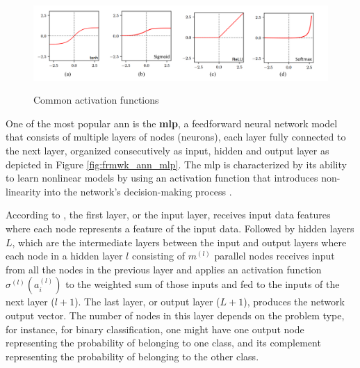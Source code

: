 \begin{figure}[htbp]
    \raggedright
        \caption{Common activation functions}
        \includegraphics[width=1\textwidth]{resources/images/030-theoretical_framework/Framework_ann_activation_function.png}
        \label{fig:frmwk_ann_activation_functions}
\end{figure}

One of the most popular \gls{ann} is the \textbf{\gls{mlp}}, a feedforward neural network model that consists of multiple layers of nodes (neurons), each layer fully connected to the next layer, organized consecutively as input, hidden and output layer as depicted in Figure \ref{fig:frmwk_ann_mlp}. The \gls{mlp} is characterized by its ability to learn nonlinear models by using an activation function that introduces non-linearity into the network's decision-making process \cite{Mitchell1997}.

According to \textcite{Russel2010}, the first layer, or the input layer, receives input data features where each node represents a feature of the input data. Followed by hidden layers $L$, which are the intermediate layers between the input and output layers where each node in a hidden layer $l$ consisting of $m^{(l)}$ parallel nodes receives input from all the nodes in the previous layer and applies an activation function $\sigma^{(l)}(a_i^{(l)})$ to the weighted sum of those inputs and fed to the inputs of the next layer ($l+1$). The last layer, or output layer ($L+1$), produces the network output vector. The number of nodes in this layer depends on the problem type, for instance, for binary classification, one might have one output node representing the probability of belonging to one class, and its complement representing the probability of belonging to the other class. 

